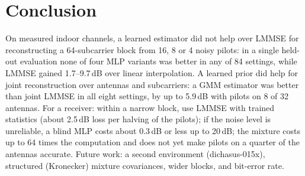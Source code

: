 \documentclass[conference]{IEEEtran}
\begin{document}
\section{Conclusion}
On measured indoor channels, a learned estimator did not help over LMMSE for reconstructing a
64-subcarrier block from 16, 8 or 4 noisy pilots: in a single held-out evaluation none of four MLP variants
was better in any of 84 settings, while LMMSE gained 1.7--9.7\,dB over linear interpolation. A learned prior did
help for joint reconstruction over antennas and subcarriers: a GMM estimator was better than joint LMMSE
in all eight settings, by up to 5.9\,dB with pilots on 8 of 32 antennas. For a receiver: within a narrow
block, use LMMSE with trained statistics (about 2.5\,dB loss per halving of the pilots); if the noise
level is unreliable, a blind MLP costs about 0.3\,dB or less up to 20\,dB; the mixture costs up to 64 times the
computation and does not yet make pilots on a quarter of the antennas accurate. Future work: a second
environment
(dichasus-015x), structured (Kronecker) mixture covariances, wider blocks, and bit-error rate.

\footnotesize


\end{document}
